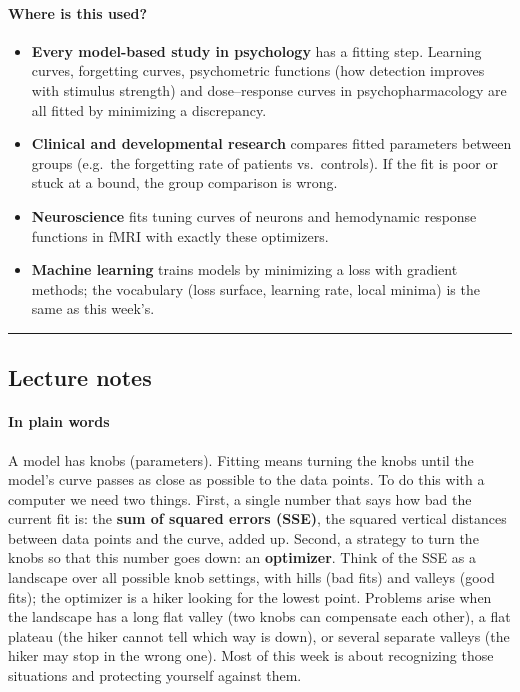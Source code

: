 \paragraph{Where is this used?}

\begin{itemize}
\tightlist
\item
  \textbf{Every model-based study in psychology} has a fitting step.
  Learning curves, forgetting curves, psychometric functions (how
  detection improves with stimulus strength) and dose--response curves
  in psychopharmacology are all fitted by minimizing a discrepancy.
\item
  \textbf{Clinical and developmental research} compares fitted
  parameters between groups (e.g.~the forgetting rate of patients
  vs.~controls). If the fit is poor or stuck at a bound, the group
  comparison is wrong.
\item
  \textbf{Neuroscience} fits tuning curves of neurons and hemodynamic
  response functions in fMRI with exactly these optimizers.
\item
  \textbf{Machine learning} trains models by minimizing a loss with
  gradient methods; the vocabulary (loss surface, learning rate, local
  minima) is the same as this week's.
\end{itemize}

\begin{center}\rule{0.5\linewidth}{0.5pt}\end{center}


\subsection{Lecture notes}

\paragraph{In plain words}

A model has knobs (parameters). Fitting means turning the knobs until
the model's curve passes as close as possible to the data points. To do
this with a computer we need two things. First, a single number that
says how bad the current fit is: the \textbf{sum of squared errors
(SSE)}, the squared vertical distances between data points and the
curve, added up. Second, a strategy to turn the knobs so that this
number goes down: an \textbf{optimizer}. Think of the SSE as a landscape
over all possible knob settings, with hills (bad fits) and valleys (good
fits); the optimizer is a hiker looking for the lowest point. Problems
arise when the landscape has a long flat valley (two knobs can
compensate each other), a flat plateau (the hiker cannot tell which way
is down), or several separate valleys (the hiker may stop in the wrong
one). Most of this week is about recognizing those situations and
protecting yourself against them.

